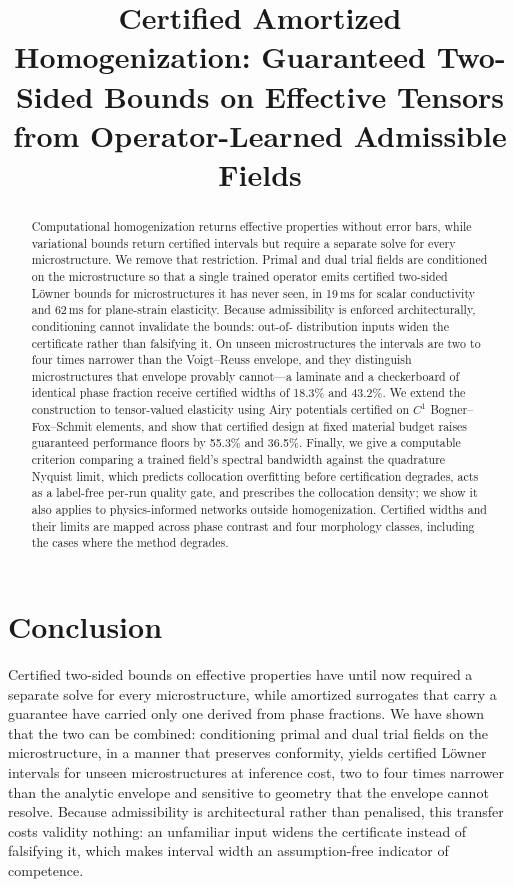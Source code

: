 \documentclass[11pt]{article}
\title{Certified Amortized Homogenization: Guaranteed Two-Sided Bounds on
Effective Tensors from Operator-Learned Admissible Fields}
\author{}
\date{}
\begin{document}
\maketitle

\begin{abstract}
Computational homogenization returns effective properties without error
bars, while variational bounds return certified intervals but require a
separate solve for every microstructure. We remove that restriction. Primal
and dual trial fields are conditioned on the microstructure so that a
single trained operator emits certified two-sided L\"owner bounds for
microstructures it has never seen, in 19\,ms for scalar conductivity and
62\,ms for plane-strain elasticity. Because admissibility is enforced
architecturally, conditioning cannot invalidate the bounds: out-of-%
distribution inputs widen the certificate rather than falsifying it. On
unseen microstructures the intervals are two to four times narrower than
the Voigt--Reuss envelope, and they distinguish microstructures that
envelope provably cannot---a laminate and a checkerboard of identical phase
fraction receive certified widths of 18.3\% and 43.2\%. We extend the
construction to tensor-valued elasticity using Airy potentials certified on
$C^1$ Bogner--Fox--Schmit elements, and show that certified design at fixed
material budget raises guaranteed performance floors by 55.3\% and 36.5\%.
Finally, we give a computable criterion comparing a trained field's
spectral bandwidth against the quadrature Nyquist limit, which predicts
collocation overfitting before certification degrades, acts as a
label-free per-run quality gate, and prescribes the collocation density; we
show it also applies to physics-informed networks outside homogenization.
Certified widths and their limits are mapped across phase contrast and four
morphology classes, including the cases where the method degrades.
\end{abstract}










\section{Conclusion}
\label{sec:conclusion}

Certified two-sided bounds on effective properties have until now required
a separate solve for every microstructure, while amortized surrogates that
carry a guarantee have carried only one derived from phase fractions. We
have shown that the two can be combined: conditioning primal and dual trial
fields on the microstructure, in a manner that preserves conformity, yields
certified L\"owner intervals for unseen microstructures at inference cost,
two to four times narrower than the analytic envelope and sensitive to
geometry that the envelope cannot resolve. Because admissibility is
architectural rather than penalised, this transfer costs validity nothing:
an unfamiliar input widens the certificate instead of falsifying it, which
makes interval width an assumption-free indicator of competence.
\end{document}
